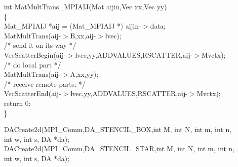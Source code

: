\begin{tabbing}
int \= MatMultTrans\_MPIAIJ(Mat aijin,Vec xx,Vec yy)\\
\{\\
 \>  Mat\_MPIAIJ *aij = (Mat\_MPIAIJ *) aijin-$>$data;\\
 \> MatMultTrans(aij-$>$B,xx,aij-$>$lvec);\\
 \> /* send it on its way */ \\
 \> VecScatterBegin(aij-$>$lvec,yy,ADDVALUES,RSCATTER,aij-$>$Mvctx);\\
 \> /* do local part */\\
 \> MatMultTrans(aij-$>$A,xx,yy);\\
 \> /* receive remote parts:  */ \\
 \> VecScatterEnd(aij-$>$lvec,yy,ADDVALUES,RSCATTER,aij-$>$Mvctx);\\
\>  return 0;\\
\}
\end{tabbing}
\ve


\vspace{1cm} 

\centerline{\hspace{3.6in} }


\vspace{-1.7in}

{\small
\begin{tabbing}
DACreate2d(MPI\_Comm,\=DA\_STENCIL\_BOX,int M, int N, int m, int n, \\
                    \> int w, int s, DA *da);\\
DACreate2d(MPI\_Comm,DA\_STENCIL\_STAR,int M, int N, int m, int n, \\
                    \> int w, int s, DA *da);
\end{tabbing}}
\ve

